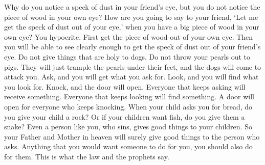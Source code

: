 Why do you notice a speck of dust in your friend's eye, but you do not notice the piece of wood in your own eye?
\bverse \iffalse Or how wilt thou say to thy brother: Let me pull the mote out of thine eye--and behold, a beam is in thine own eye? \fi
How are you going to say to your friend, \lq Let me get the speck of dust out of your eye,\rq{} when you have a big piece of wood in your own eye?
\bverse \iffalse Thou hypocrite, first cast the beam out of thine own eye; and then shalt thou see clearly to cast the mote out of thy brother's eye. \fi
You hypocrite. First get the piece of wood out of your own eye. Then you will be able to see clearly enough to get the speck of dust out of your friend's eye.
\bverse \iffalse Give not that which is holy unto the dogs, neither cast ye your pearls before swine, lest they trample them under their feet, and turn again and rend you. \fi
Do not give things that are holy to dogs. Do not throw your pearls out to pigs. They will just trample the pearls under their feet, and the dogs will come to attack you.
\bverse \iffalse Ask, and it shall be given unto you; seek, and ye shall find; knock, and it shall be opened unto you. \fi
Ask, and you will get what you ask for. Look, and you will find what you look for. Knock, and the door will open.
\bverse \iffalse For every one that asketh, receiveth; and he that seeketh, findeth; and to him that knocketh, it shall be opened. \fi
Everyone that keeps asking will receive something. Everyone that keeps looking will find something. A door will open for everyone who keeps knocking.
\bverse \iffalse Or what man is there of you, who, if his son ask bread, will give him a stone? \fi
When your child asks you for bread, do you give your child a rock?
\bverse \iffalse Or if he ask a fish, will he give him a serpent? \fi
Or if your children want fish, do you give them a snake?
\bverse \iffalse If ye then, being evil, know how to give good gifts unto your children, how much more shall your Father who is in heaven give good things to them that ask him? \fi
Even a person like you, who sins, gives good things to your children. So your Father and Mother in heaven will surely give good things to the person who asks.
\bverse \iffalse Therefore, all things whatsoever ye would that men should do to you, do ye even so to them, for this is the law and the prophets. \fi
Anything that you would want someone to do for you, you should also do for them. This is what the law and the prophets say.
